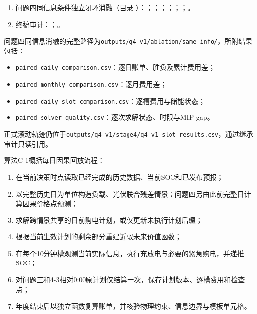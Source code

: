 \documentclass[zihao=-4,a4paper,UTF8,fontset=none]{ctexart}
\providecommand{\tightlist}{\setlength{\itemsep}{0pt}\setlength{\parskip}{0pt}}
\begin{document}
\begin{enumerate}[leftmargin=2.2em,itemsep=0.35em]
\item 问题四同信息条件独立闭环消融（目录 ）：；；；；；；。
\item 终稿审计：；。
\end{enumerate}

问题四同信息消融的完整路径为\texttt{outputs/q4\_v1/ablation/same\_info/}，所附结果包括：

\begin{itemize}
\tightlist
\item
  \texttt{paired\_daily\_comparison.csv}：逐日账单、胜负及累计费用差；
\item
  \texttt{paired\_monthly\_comparison.csv}：逐月费用差；
\item
  \texttt{paired\_daily\_slot\_comparison.csv}：逐槽费用与储能状态；
\item
  \texttt{paired\_solver\_quality.csv}：逐次求解状态、时限与MIP gap。
\end{itemize}

正式滚动轨迹仍位于\texttt{outputs/q4\_v1/stage4/q4\_v1\_slot\_results.csv}，通过继承审计只读引用。

算法C-1概括每日因果回放流程：

\begin{enumerate}
\def\labelenumi{\arabic{enumi}.}
\tightlist
\item
  在当前决策时点读取已经完成的历史数据、当前SOC和已发布预报；
\item
  以完整历史日为单位构造负载、光伏联合残差情景；问题四另由此前完整日计算因果价格点预测；
\item
  求解跨情景共享的日前购电计划，或仅更新未执行计划后缀；
\item
  根据当前生效计划的剩余部分重建近似未来价值函数；
\item
  在每个10分钟槽观测当前实际信息，执行充放电与必要的紧急购电，并递推SOC；
\item
  对问题三和4-3相对0:00原计划仅结算一次，保存计划版本、逐槽费用和检查点；
\item
  年度结束后以独立函数复算账单，并核验物理约束、信息边界与模板单元格。
\end{enumerate}
\end{document}
